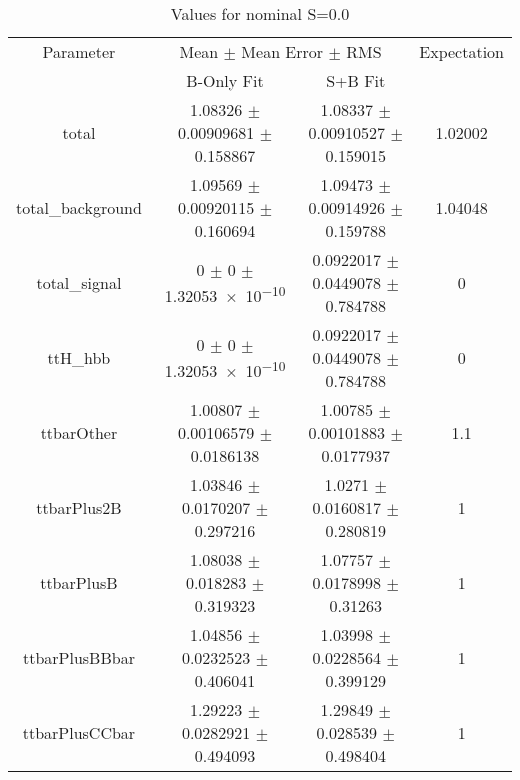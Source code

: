 \begin{table}
\centering
\caption{Values for nominal S=0.0}
\begin{tabular}{cccc}
\toprule
Parameter & \multicolumn{2}{c}{Mean $\pm$ Mean Error $\pm$ RMS} & Expectation\\
 & B-Only Fit & S+B Fit & \\
\midrule
total & \num{1.08326} $\pm$ \num{0.00909681} $\pm$ \num{0.158867} & \num{1.08337} $\pm$ \num{0.00910527} $\pm$ \num{0.159015} & \num{1.02002}\\
total\_background & \num{1.09569} $\pm$ \num{0.00920115} $\pm$ \num{0.160694} & \num{1.09473} $\pm$ \num{0.00914926} $\pm$ \num{0.159788} & \num{1.04048}\\
total\_signal & \num{0} $\pm$ \num{0} $\pm$ \num{1.32053e-10} & \num{0.0922017} $\pm$ \num{0.0449078} $\pm$ \num{0.784788} & \num{0}\\
ttH\_hbb & \num{0} $\pm$ \num{0} $\pm$ \num{1.32053e-10} & \num{0.0922017} $\pm$ \num{0.0449078} $\pm$ \num{0.784788} & \num{0}\\
ttbarOther & \num{1.00807} $\pm$ \num{0.00106579} $\pm$ \num{0.0186138} & \num{1.00785} $\pm$ \num{0.00101883} $\pm$ \num{0.0177937} & \num{1.1}\\
ttbarPlus2B & \num{1.03846} $\pm$ \num{0.0170207} $\pm$ \num{0.297216} & \num{1.0271} $\pm$ \num{0.0160817} $\pm$ \num{0.280819} & \num{1}\\
ttbarPlusB & \num{1.08038} $\pm$ \num{0.018283} $\pm$ \num{0.319323} & \num{1.07757} $\pm$ \num{0.0178998} $\pm$ \num{0.31263} & \num{1}\\
ttbarPlusBBbar & \num{1.04856} $\pm$ \num{0.0232523} $\pm$ \num{0.406041} & \num{1.03998} $\pm$ \num{0.0228564} $\pm$ \num{0.399129} & \num{1}\\
ttbarPlusCCbar & \num{1.29223} $\pm$ \num{0.0282921} $\pm$ \num{0.494093} & \num{1.29849} $\pm$ \num{0.028539} $\pm$ \num{0.498404} & \num{1}\\
\bottomrule
\end{tabular}
\end{table}